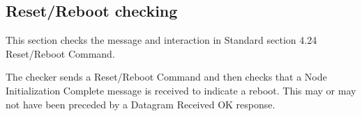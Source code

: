\documentclass[11pt]{article}
\begin{document}
\subsection{Reset/Reboot checking}

This section checks the message and interaction in Standard section 4.24 Reset/Reboot Command.

The checker sends a Reset/Reboot Command and then checks that a Node Initialization 
Complete message is received to indicate a reboot.  This may or may not have been
preceded by a Datagram Received OK response.
\end{document}
